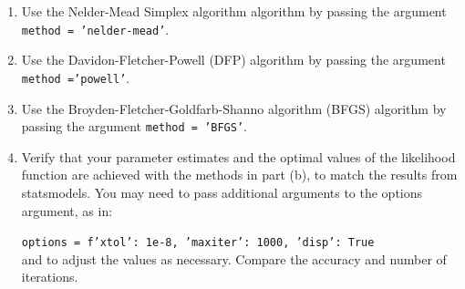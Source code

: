 \documentclass[11pt]{exam}
\begin{document}
\begin{questions}
\begin{parts}
\begin{enumerate}
 \item Use the Nelder-Mead Simplex algorithm algorithm by passing the argument \texttt{method = 'nelder-mead'}.

\item Use the Davidon-Fletcher-Powell (DFP) algorithm by passing the argument \texttt{method ='powell'}.
\item Use the Broyden-Fletcher-Goldfarb-Shanno algorithm (BFGS) algorithm by passing the argument \texttt{method = 'BFGS'}.

\item Verify that your parameter estimates and the optimal values of the likelihood function are achieved with the methods in part (b), to match the results from statsmodels. You may need to pass additional arguments to the options argument, as in:


\texttt{options = f'xtol': 1e-8, 'maxiter': 1000, 'disp': True}
~\\

and to adjust the values as necessary. Compare the accuracy and number of iterations.

\end{enumerate}


\end{parts}


    \end{questions}
\end{document}
